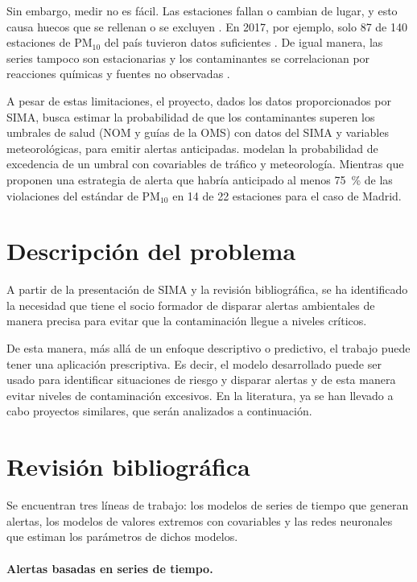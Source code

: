 \documentclass[11pt]{article}
\begin{document}
Sin embargo, medir no es fácil. Las estaciones fallan o cambian de lugar, y esto causa huecos que se rellenan \citep{montero2011} o se excluyen \citep{gyarmati2017}. En 2017, por ejemplo, solo 87 de 140 estaciones de PM$_{10}$ del país tuvieron datos suficientes \citep{ssa2021a}. De igual manera, las series tampoco son estacionarias y los contaminantes se correlacionan por reacciones químicas y fuentes no observadas \citep{gyarmati2017}.

A pesar de estas limitaciones, el proyecto, dados los datos proporcionados por SIMA, busca estimar la probabilidad de que los contaminantes superen los umbrales de salud (NOM y guías de la OMS) con datos del SIMA y variables meteorológicas, para emitir alertas anticipadas. \citet{gyarmati2017} modelan la probabilidad de excedencia de un umbral con covariables de tráfico y meteorología. Mientras que \citet{montero2011} proponen una estrategia de alerta que habría anticipado al menos 75~\% de las violaciones del estándar de PM$_{10}$ en 14 de 22 estaciones para el caso de Madrid.

\section{Descripción del problema}

A partir de la presentación de SIMA \citep{simapresentacion} y la revisión bibliográfica, se ha identificado la necesidad que tiene el socio formador de disparar alertas ambientales de manera precisa para evitar que la contaminación llegue a niveles críticos.

De esta manera, más allá de un enfoque descriptivo o predictivo, el trabajo puede tener una aplicación prescriptiva. Es decir, el modelo desarrollado puede ser usado para identificar situaciones de riesgo y disparar alertas y de esta manera evitar niveles de contaminación excesivos. En la literatura, ya se han llevado a cabo proyectos similares, que serán analizados a continuación.

\section{Revisión bibliográfica}

 Se encuentran tres líneas de trabajo: los modelos de series de tiempo que generan alertas, los modelos de valores extremos con covariables y las redes neuronales que estiman los parámetros de dichos modelos. 

\paragraph{Alertas basadas en series de tiempo.}
\end{document}
